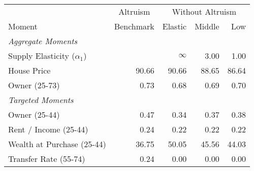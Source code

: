 \begin{tabular}{lrrrr}
 \toprule & \multicolumn{1}{c}{Altruism} & \multicolumn{3}{c}{Without Altruism}  \\  \cmidrule(lr){2-2} \cmidrule(lr){3-5} 

Moment & Benchmark & Elastic & Middle & Low\\
\midrule
\textit{Aggregate Moments} &  &  &  & \\
\;Supply Elasticity ($\alpha_1$) &  & $ \infty $ & 3.00 & 1.00\\
\;House Price & 90.66 & 90.66 & 88.65 & 86.64\\
\;Owner (25-73) & 0.73 & 0.68 & 0.69 & 0.70\\
\textit{Targeted Moments} &  &  &  & \\
\;Owner (25-44) & 0.47 & 0.34 & 0.37 & 0.38\\
\;Rent / Income (25-44) & 0.24 & 0.22 & 0.22 & 0.22\\
\;Wealth at Purchase (25-44) & 36.75 & 50.05 & 45.56 & 44.03\\
\;Transfer Rate (55-74) & 0.24 & 0.00 & 0.00 & 0.00\\
\bottomrule
\end{tabular}
